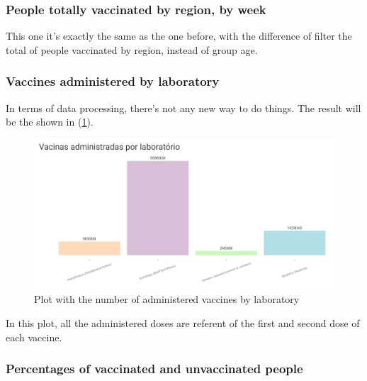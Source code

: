 \subsubsection{People totally vaccinated by region, by week}

This one it's exactly the same as the one before, with the difference of filter the total of people vaccinated by region, instead of group age.

\subsubsection{Vaccines administered by laboratory}

In terms of data processing, there's not any new way to do things. The result will be the shown in (\ref{fig:ages-vac-5}).\\
\begin{figure}[H]
\centering
\includegraphics[width=350pt,trim=10 0 0 -10mm]{images/p5.png}
\caption{Plot with the number of administered vaccines by laboratory}
\label{fig:ages-vac-5}
\end{figure}

In this plot, all the administered doses are referent of the first and second dose of each vaccine.

\subsubsection{Percentages of vaccinated and unvaccinated people}

